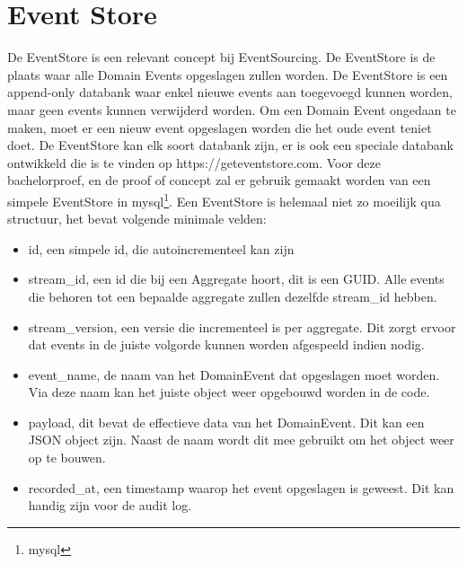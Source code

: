 
\section{Event Store}
\label{sec:event-store}

De EventStore is een relevant concept bij EventSourcing. De EventStore is de plaats waar alle Domain Events opgeslagen zullen worden. De EventStore is een append-only databank waar enkel nieuwe events aan toegevoegd kunnen worden, maar geen events kunnen verwijderd worden. Om een Domain Event ongedaan te maken, moet er een nieuw event opgeslagen worden die het oude event teniet doet. De EventStore kan elk soort databank zijn, er is ook een speciale databank ontwikkeld die is te vinden op https://geteventstore.com. Voor deze bachelorproef, en de proof of concept zal er gebruik gemaakt worden van een simpele EventStore in \gls{mysql}\footnote{\glsdesc{mysql}}. Een EventStore is helemaal niet zo moeilijk qua structuur, het bevat volgende minimale velden:

\begin{itemize}
  \item{id, een simpele id, die autoincrementeel kan zijn}
  \item{stream_id, een id die bij een Aggregate hoort, dit is een \gls{GUID}. Alle events die behoren tot een bepaalde aggregate zullen dezelfde stream_id hebben.}
  \item{stream_version, een versie die incrementeel is per aggregate. Dit zorgt ervoor dat events in de juiste volgorde kunnen worden afgespeeld indien nodig.}
  \item{event_name, de naam van het DomainEvent dat opgeslagen moet worden. Via deze naam kan het juiste object weer opgebouwd worden in de code.}
  \item{payload, dit bevat de effectieve data van het DomainEvent. Dit kan een \gls{JSON} object zijn. Naast de naam wordt dit mee gebruikt om het object weer op te bouwen.}
  \item{recorded_at, een timestamp waarop het event opgeslagen is geweest. Dit kan handig zijn voor de audit log.}
\end{itemize}
